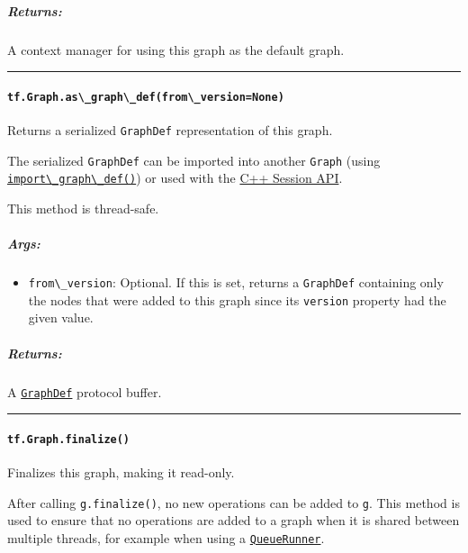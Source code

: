 \subparagraph{Returns: }\label{returns}

A context manager for using this graph as the default graph.

\begin{center}\rule{0.5\linewidth}{\linethickness}\end{center}

\paragraph{\texorpdfstring{\lstinline{tf.Graph.as\_graph\_def(from\_version=None)}
}{tf.Graph.as\_graph\_def(from\_version=None) }}\label{tf.graph.asux5fgraphux5fdeffromux5fversionnone}

Returns a serialized \lstinline{GraphDef} representation of this graph.

The serialized \lstinline{GraphDef} can be imported into another
\lstinline{Graph} (using
\protect\hyperlink{importux5fgraphux5fdef}{\lstinline{import\_graph\_def()}})
or used with the \href{../../api_docs/cc/index.md}{C++ Session API}.

This method is thread-safe.

\subparagraph{Args: }\label{args}

\begin{itemize}
\tightlist
\item
  \lstinline{from\_version}: Optional. If this is set, returns a
  \lstinline{GraphDef} containing only the nodes that were added to this
  graph since its \lstinline{version} property had the given value.
\end{itemize}

\subparagraph{Returns: }\label{returns-1}

A
\href{https://tensorflow.googlesource.com/tensorflow/+/master/tensorflow/core/framework/graph.proto}{\lstinline{GraphDef}}
protocol buffer.

\begin{center}\rule{0.5\linewidth}{\linethickness}\end{center}

\paragraph{\texorpdfstring{\lstinline{tf.Graph.finalize()}
}{tf.Graph.finalize() }}\label{tf.graph.finalize}

Finalizes this graph, making it read-only.

After calling \lstinline{g.finalize()}, no new operations can be added to
\lstinline{g}. This method is used to ensure that no operations are added
to a graph when it is shared between multiple threads, for example when
using a
\href{../../api_docs/python/train.md\#QueueRunner}{\lstinline{QueueRunner}}.


